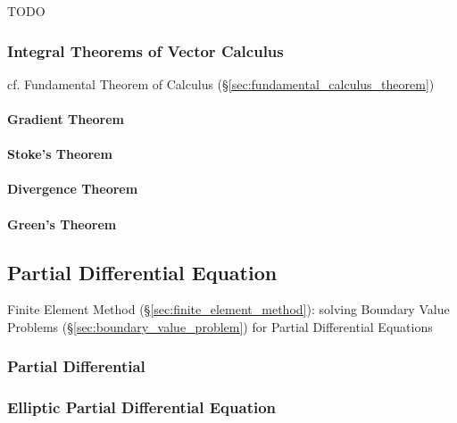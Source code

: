TODO



\subsubsection{Integral Theorems of Vector Calculus}
\label{sec:integral_theorems}

cf. Fundamental Theorem of Calculus (\S\ref{sec:fundamental_calculus_theorem})

\paragraph{Gradient Theorem}\label{sec:gradient_theorem}\hfill

\paragraph{Stoke's Theorem}\label{sec:stokes_theorem}\hfill

\paragraph{Divergence Theorem}\label{sec:divergence_theorem}\hfill

\paragraph{Green's Theorem}\label{sec:greens_theorem}\hfill



\subsection{Partial Differential Equation}
\label{sec:partial_differential_equation}


Finite Element Method (\S\ref{sec:finite_element_method}): solving
Boundary Value Problems (\S\ref{sec:boundary_value_problem}) for
Partial Differential Equations



\subsubsection{Partial Differential}\label{sec:partial_differential}

\subsubsection{Elliptic Partial Differential Equation}
\label{sec:elliptic_partial_differential}

